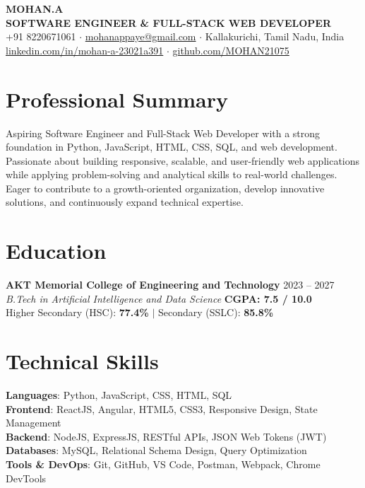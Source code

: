 \documentclass[a4paper,9.5pt]{article}
\begin{document}
\begin{center}
    {\LARGE \textbf{MOHAN.A}} \\ \vspace{1pt}
    \textbf{\footnotesize SOFTWARE ENGINEER \& FULL-STACK WEB DEVELOPER} \\ \vspace{2pt}
    \footnotesize +91 8220671061 $\cdot$ \href{mailto:mohanappaye@gmail.com}{mohanappaye@gmail.com} $\cdot$ Kallakurichi, Tamil Nadu, India \\ \vspace{1pt}
    \href{https://in.linkedin.com/in/mohan-a-23021a391}{linkedin.com/in/mohan-a-23021a391} $\cdot$ \href{https://github.com/MOHAN21075}{github.com/MOHAN21075}
\end{center}
\vspace{-6pt}

\section{Professional Summary}
\footnotesize{Aspiring Software Engineer and Full-Stack Web Developer with a strong foundation in Python, JavaScript, HTML, CSS, SQL, and web development. Passionate about building responsive, scalable, and user-friendly web applications while applying problem-solving and analytical skills to real-world challenges. Eager to contribute to a growth-oriented organization, develop innovative solutions, and continuously expand technical expertise.}

\section{Education}
\textbf{\footnotesize AKT Memorial College of Engineering and Technology} \hfill \footnotesize 2023 -- 2027 \\
\textit{\footnotesize B.Tech in Artificial Intelligence and Data Science} \hfill \textbf{\footnotesize CGPA: 7.5 / 10.0} \\
\footnotesize{Higher Secondary (HSC): \textbf{77.4\%} \quad $|$ \quad Secondary (SSLC): \textbf{85.8\%}}

\section{Technical Skills}
\begin{itemize}[leftmargin=0.1in, label={}, itemsep=-2pt, topsep=1pt]
    \footnotesize{\item{
     \textbf{Languages}{: Python, JavaScript, CSS, HTML, SQL} \\
     \textbf{Frontend}{: ReactJS, Angular, HTML5, CSS3, Responsive Design, State Management} \\
     \textbf{Backend}{: NodeJS, ExpressJS, RESTful APIs, JSON Web Tokens (JWT)} \\
     \textbf{Databases}{: MySQL, Relational Schema Design, Query Optimization} \\
     \textbf{Tools \& DevOps}{: Git, GitHub, VS Code, Postman, Webpack, Chrome DevTools}
    }}
\end{itemize}
\end{document}
